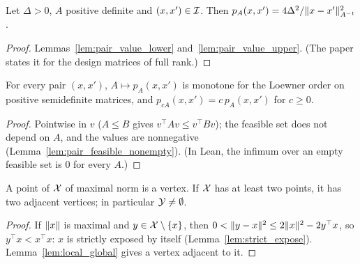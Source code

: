 \begin{lemma}
  \label{lem:equality}
  \leanok
  Let $\Delta > 0$, $A$ positive definite and $(x, x') \in \mathcal{I}$. Then
  $p_A(x, x') = 4\Delta^2 / \lVert x - x' \rVert^2_{A^{-1}}$.
\end{lemma}

\begin{proof}
  \leanok
  Lemmas~\ref{lem:pair_value_lower} and~\ref{lem:pair_value_upper}. (The paper states it for the
  design matrices of full rank.)
\end{proof}

\begin{lemma}
  \label{lem:pair_value_mono}
  \leanok
  For every pair $(x, x')$, $A \mapsto p_A(x, x')$ is monotone for the Loewner order on positive
  semidefinite matrices, and $p_{cA}(x, x') = c\, p_A(x, x')$ for $c \ge 0$.
\end{lemma}

\begin{proof}
  \leanok
  Pointwise in $v$ ($A \le B$ gives $v^\top A v \le v^\top B v$); the feasible set does not depend
  on $A$, and the values are nonnegative (Lemma~\ref{lem:pair_feasible_nonempty}). (In Lean, the
  infimum over an empty feasible set is $0$ for every $A$.)
\end{proof}

\begin{lemma}
  \label{lem:exists_adjacent_pair}
  \leanok
  A point of $\mathcal{X}$ of maximal norm is a vertex. If $\mathcal{X}$ has at least two points, it has two
  adjacent vertices; in particular $\mathcal{Y} \ne \emptyset$.
\end{lemma}

\begin{proof}
  \leanok
  If $\lVert x \rVert$ is maximal and $y \in \mathcal{X} \setminus \{x\}$, then
  $0 < \lVert y - x \rVert^2 \le 2 \lVert x \rVert^2 - 2 y^\top x$, so $y^\top x < x^\top x$: $x$ is strictly
  exposed by itself (Lemma~\ref{lem:strict_expose}). Lemma~\ref{lem:local_global} gives a vertex
  adjacent to it.
\end{proof}

